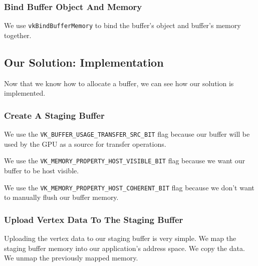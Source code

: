 \begin{minipage}{\linewidth}{\noindent}
    
\end{minipage}

\subsubsection{Bind Buffer Object And Memory}

We use \texttt{vkBindBufferMemory} to bind the buffer's object and
buffer's memory together.

\subsection{Our Solution: Implementation}

Now that we know how to allocate a buffer, we can see how our solution
is implemented.

\subsubsection{Create A Staging Buffer}

We use the \texttt{VK\_BUFFER\_USAGE\_TRANSFER\_SRC\_BIT} flag
because our buffer will be used by the GPU as a source for
transfer operations.

We use the \texttt{VK\_MEMORY\_PROPERTY\_HOST\_VISIBLE\_BIT} flag
because we want our buffer to be host visible.

We use the \texttt{VK\_MEMORY\_PROPERTY\_HOST\_COHERENT\_BIT} flag
because we don't want to manually flush our buffer memory.

\begin{minipage}{\linewidth}{\noindent}
    
\end{minipage}

\subsubsection{Upload Vertex Data To The Staging Buffer}

Uploading the vertex data to our staging buffer is very simple.
We map the staging buffer memory into our application's address space.
We copy the data.
We unmap the previously mapped memory.

